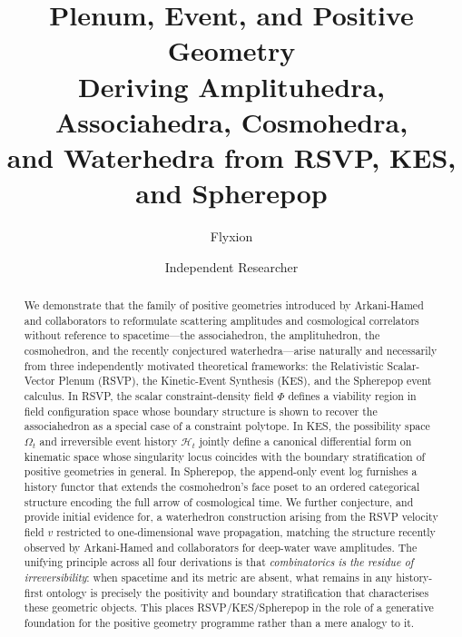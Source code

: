 \documentclass[12pt, oneside]{amsart}
\title{\textbf{Plenum, Event, and Positive Geometry}\\[0.5em]
\large Deriving Amplituhedra, Associahedra, Cosmohedra,\\
and Waterhedra from RSVP, KES, and Spherepop}
\author{Flyxion}
\date{Independent Researcher \\ \smallskip 2026}
\theoremstyle{plain}
\theoremstyle{definition}
\theoremstyle{remark}
\newcommand{\OmKS}{\Omega}
\newcommand{\HKS}{\mathcal{H}}
\begin{document}

\maketitle
\thispagestyle{empty}

\begin{abstract}
We demonstrate that the family of positive geometries introduced by Arkani-Hamed and collaborators to reformulate scattering amplitudes and cosmological correlators without reference to spacetime---the associahedron, the amplituhedron, the cosmohedron, and the recently conjectured waterhedra---arise naturally and necessarily from three independently motivated theoretical frameworks: the Relativistic Scalar-Vector Plenum (RSVP), the Kinetic-Event Synthesis (KES), and the Spherepop event calculus. In RSVP, the scalar constraint-density field $\Phi$ defines a viability region in field configuration space whose boundary structure is shown to recover the associahedron as a special case of a constraint polytope. In KES, the possibility space $\OmKS_t$ and irreversible event history $\HKS_t$ jointly define a canonical differential form on kinematic space whose singularity locus coincides with the boundary stratification of positive geometries in general. In Spherepop, the append-only event log furnishes a history functor that extends the cosmohedron's face poset to an ordered categorical structure encoding the full arrow of cosmological time. We further conjecture, and provide initial evidence for, a waterhedron construction arising from the RSVP velocity field $v$ restricted to one-dimensional wave propagation, matching the structure recently observed by Arkani-Hamed and collaborators for deep-water wave amplitudes. The unifying principle across all four derivations is that \emph{combinatorics is the residue of irreversibility}: when spacetime and its metric are absent, what remains in any history-first ontology is precisely the positivity and boundary stratification that characterises these geometric objects. This places RSVP/KES/Spherepop in the role of a generative foundation for the positive geometry programme rather than a mere analogy to it.
\end{abstract}

\vspace{1em}
\tableofcontents

\newpage

\end{document}
